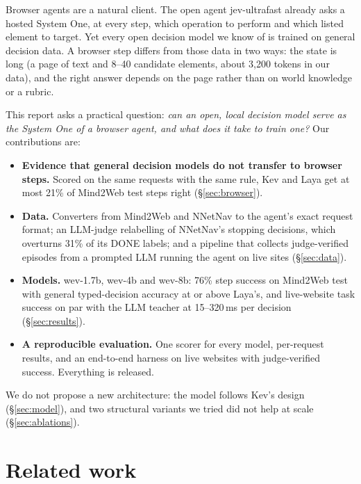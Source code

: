 \documentclass[11pt]{article}
\begin{document}
Browser agents are a natural client. The open agent jev-ultrafast \citep{jevultrafast} already asks a hosted System
One, at every step, which operation to perform and which listed element to target. Yet every open decision model we
know of is trained on general decision data. A browser step differs from those data in two ways: the state is long (a
page of text and 8--40 candidate elements, about 3{,}200 tokens in our data), and the right answer depends on the
page rather than on world knowledge or a rubric.

This report asks a practical question: \emph{can an open, local decision model serve as the System One of a browser
agent, and what does it take to train one?} Our contributions are:
\begin{itemize}
\item \textbf{Evidence that general decision models do not transfer to browser steps.} Scored on the same requests with
the same rule, Kev and Laya get at most 21\% of Mind2Web test steps right (\S\ref{sec:browser}).
\item \textbf{Data.} Converters from Mind2Web \citep{mind2web} and NNetNav \citep{nnetnav} to the agent's exact request
format; an LLM-judge relabelling of NNetNav's stopping decisions, which overturns 31\% of its DONE labels; and a
pipeline that collects judge-verified episodes from a prompted LLM running the agent on live sites (\S\ref{sec:data}).
\item \textbf{Models.} wev-1.7b, wev-4b and wev-8b: 76\% step success on Mind2Web test with general typed-decision
accuracy at or above Laya's, and live-website task success on par with the LLM teacher at 15--320\,ms per decision
(\S\ref{sec:results}).
\item \textbf{A reproducible evaluation.} One scorer for every model, per-request results, and an end-to-end harness
on live websites with judge-verified success. Everything is released.
\end{itemize}
We do not propose a new architecture: the model follows Kev's design (\S\ref{sec:model}), and two structural variants
we tried did not help at scale (\S\ref{sec:ablations}).

\section{Related work}
\end{document}

